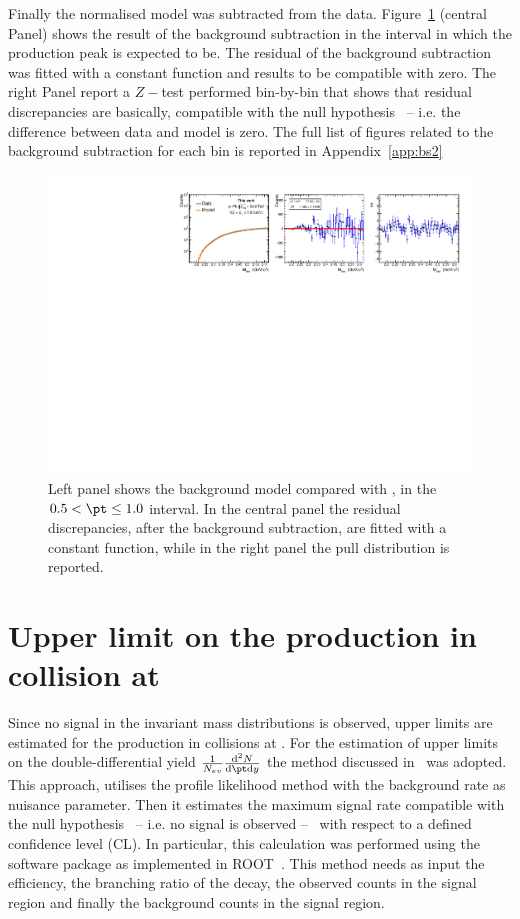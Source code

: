 Finally the normalised model was subtracted from the data.
Figure~\ref{fig:bs1} (central Panel) shows the result of the background subtraction in the \pt interval
in which the \ds production peak is expected to be. The residual of the background subtraction was
fitted with a constant function and results to be compatible with zero.
The right Panel report a $Z-$test performed bin-by-bin that shows that residual discrepancies 
are basically, compatible with the null hypothesis \ -- i.e. the difference between data and model is zero. 
The full list of figures related to the background subtraction for each \pt bin is reported in 
Appendix~\ref{app:bs2}
\begin{figure} [htb]
    \centering
    \includegraphics[width=\textwidth]{gfx/appendix/backsub/canvas1}
    \caption{Left panel shows the background model compared with \minv, in the $0.5 < \pt \leq 1.0$ \gevc interval. In the central panel the residual discrepancies, after the background subtraction, are fitted with a constant function, while in the right panel the pull distribution is reported.}
    \label{fig:bs1}
\end{figure}

%
\section{Upper limit on the \ds production in \pPb collision at \sctev} \label{sec:upperlimit}

Since no signal in the invariant mass distributions is observed, upper limits are estimated for
the \ds production in \pPb collisions at \sctev.
For the estimation of upper limits on the double-differential yield
$\frac{1}{N_{ev}}\frac{\mathrm{d}^{2}N}{\mathrm{d}\pt\mathrm{d}y}$ the method discussed in~\cite{rolke}
was adopted. 
This approach, utilises the profile likelihood method with the background rate as nuisance
parameter. Then it estimates the maximum signal rate compatible with the null hypothesis \ -- i.e.
no signal is observed -- \ with respect to a defined confidence level (CL).
In particular, this calculation was performed using the software package  
as implemented in ROOT~\cite{root}. 
This method needs as input the efficiency, the branching ratio of the decay, the observed counts in the
signal region and finally the background counts in the signal region.


